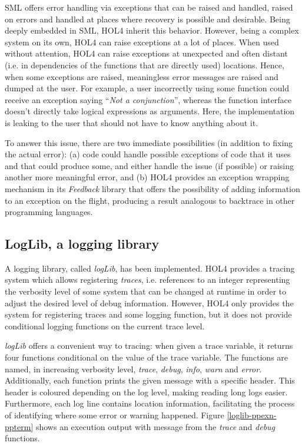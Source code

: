\documentclass{kththesis}
\begin{document}
{\gls{SML} offers error handling via exceptions that can be raised and handled, raised on errors and handled at places where recovery is possible and desirable. Being deeply embedded in SML, HOL4 inherit this behavior. However, being a complex system on its own, HOL4 can raise exceptions at a lot of places. When used without attention, HOL4 can raise exceptions at unexpected and often distant (i.e. in dependencies of the functions that are directly used) locations. Hence, when some exceptions are raised, meaningless error messages are raised and dumped at the user. For example, a user incorrectly using some function could receive an exception saying ``\textit{Not a conjunction}'', whereas the function interface doesn't directly take logical expressions as arguments. Here, the implementation is leaking to the user that should not have to know anything about it.

To answer this issue, there are two immediate possibilities (in addition to fixing the actual error): (a) code could handle possible exceptions of code that it uses and that could produce some, and either handle the issue (if possible) or raising another more meaningful error, and (b) HOL4 provides an exception wrapping mechanism in its \textit{Feedback} library that offers the possibility of adding information to an exception on the flight, producing a result analogous to backtrace in other programming languages.

\subsection{LogLib, a logging library} \label{loglib}

A logging library, called \textit{logLib}, has been implemented. HOL4 provides a tracing system which allows registering \textit{traces}, i.e. references to an integer representing the verbosity level of some system that can be changed at runtime in order to adjust the desired level of debug information. However, HOL4 only provides the system for registering traces and some logging function, but it does not provide conditional logging functions on the current trace level.

\textit{logLib} offers a convenient way to tracing: when given a trace variable, it returns four functions conditional on the value of the trace variable. The functions are named, in increasing verbosity level, \textit{trace}, \textit{debug}, \textit{info}, \textit{warn} and \textit{error}. Additionally, each function prints the given message with a specific header. This header is coloured depending on the log level, making reading long logs easier. Furthermore, each log line contains location information, facilitating the process of identifying where some error or warning happened. Figure \ref{loglib-ppexn-ppterm} shows an execution output with message from the \textit{trace} and \textit{debug} functions.

}
\end{document}
